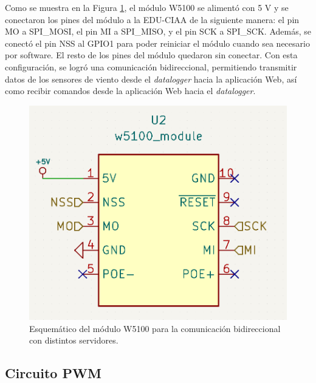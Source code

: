 Como se muestra en la Figura \ref{fig:esquemEthernet}, el módulo W5100 se alimentó con 5 \unit{\volt} y se conectaron los pines del módulo a la EDU-CIAA de la siguiente manera: el pin MO a SPI\_MOSI, el pin MI a SPI\_MISO, y el pin SCK a SPI\_SCK. Además, se conectó el pin NSS al GPIO1 para poder reiniciar el módulo cuando sea necesario por software. El resto de los pines del módulo quedaron sin conectar. Con esta configuración, se logró una comunicación bidireccional, permitiendo transmitir datos de los sensores de viento desde el \textit{datalogger} hacia la aplicación Web, así como recibir comandos desde la aplicación Web hacia el \textit{datalogger}.
\begin{figure}[H]
    \centering
    \includegraphics[width=0.5\linewidth]{Figuras/datalogger/Hardware/esquemEthernet.png}
    \caption{Esquemático del módulo W5100 para la comunicación bidireccional con distintos servidores.}
    \label{fig:esquemEthernet}
\end{figure}


\subsection{Circuito PWM}\label{sec:circuitoPWM}


